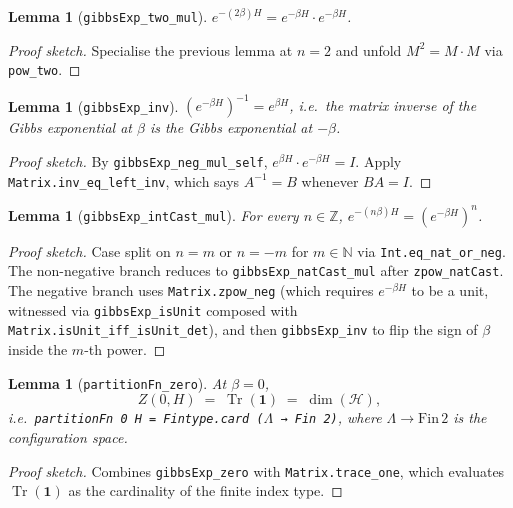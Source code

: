 \documentclass[a4paper,11pt]{article}
\newtheorem{lemma}[theorem]{Lemma}
\begin{document}
\begin{lemma}[\texttt{gibbsExp\_two\_mul}]
$e^{-(2\beta) H} = e^{-\beta H} \cdot e^{-\beta H}$.
\end{lemma}

\begin{proof}[Proof sketch]
Specialise the previous lemma at $n = 2$ and unfold $M^2 = M \cdot M$
via \texttt{pow\_two}.
\end{proof}

\begin{lemma}[\texttt{gibbsExp\_inv}]
$(e^{-\beta H})^{-1} = e^{\beta H}$, i.e.\ the matrix inverse of the
Gibbs exponential at $\beta$ is the Gibbs exponential at $-\beta$.
\end{lemma}

\begin{proof}[Proof sketch]
By \texttt{gibbsExp\_neg\_mul\_self},
$e^{\beta H} \cdot e^{-\beta H} = I$.  Apply
\texttt{Matrix.inv\_eq\_left\_inv}, which says $A^{-1} = B$ whenever
$B A = I$.
\end{proof}

\begin{lemma}[\texttt{gibbsExp\_intCast\_mul}]
For every $n \in \mathbb{Z}$,
$e^{-(n\beta) H} = (e^{-\beta H})^n$.
\end{lemma}

\begin{proof}[Proof sketch]
Case split on $n = m$ or $n = -m$ for $m \in \mathbb{N}$ via
\texttt{Int.eq\_nat\_or\_neg}. The non-negative branch reduces to
\texttt{gibbsExp\_natCast\_mul} after \texttt{zpow\_natCast}. The
negative branch uses \texttt{Matrix.zpow\_neg} (which requires
$e^{-\beta H}$ to be a unit, witnessed via
\texttt{gibbsExp\_isUnit} composed with
\texttt{Matrix.isUnit\_iff\_isUnit\_det}), and then
\texttt{gibbsExp\_inv} to flip the sign of $\beta$ inside the
$m$-th power.
\end{proof}

\begin{lemma}[\texttt{partitionFn\_zero}]
At $\beta = 0$,
\[
  Z(0, H) \;=\; \operatorname{Tr}(\mathbf{1}) \;=\; \dim(\mathcal{H}),
\]
i.e.\ \texttt{partitionFn 0 H = Fintype.card ($\Lambda$ → Fin 2)},
where $\Lambda \to \mathrm{Fin}\,2$ is the configuration space.
\end{lemma}

\begin{proof}[Proof sketch]
Combines \texttt{gibbsExp\_zero} with \texttt{Matrix.trace\_one}, which
evaluates $\operatorname{Tr}(\mathbf{1})$ as the cardinality of the
finite index type.
\end{proof}
\end{document}

